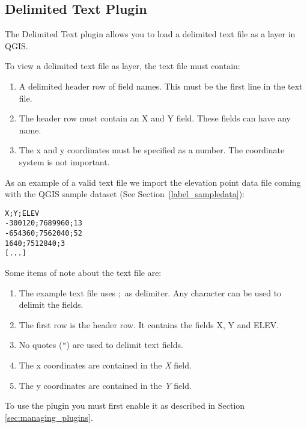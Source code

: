 
\subsection{Delimited Text Plugin}\label{label_dltext}    


The Delimited Text plugin allows you to load a delimited text file as a layer in QGIS. 


To view a delimited text file as layer, the text file must contain:

\begin{enumerate}      
\item A delimited header row of field names. This must be the first line in the text file.
\item The header row must contain an X and Y field. These fields can have any name.
\item The x and y coordinates must be specified as a number. The coordinate system is not important.
\end{enumerate}

As an example of a valid text file we import the elevation point data file 
 coming with the QGIS sample dataset (See Section~\ref{label_sampledata}):

\begin{verbatim} 
X;Y;ELEV
-300120;7689960;13
-654360;7562040;52
1640;7512840;3
[...]
\end{verbatim}

Some items of note about the text file are:

\begin{enumerate}
\item The example text file uses \mbox{$;$} as delimiter. Any character can be used to delimit the fields.
\item The first row is the header row. It contains the fields X, Y and ELEV.
\item No quotes ({\tt{}"{}}) are used to delimit text fields.
\item The x coordinates are contained in the {\em X} field.
\item The y coordinates are contained in the {\em Y} field.
\end{enumerate}

To use the plugin you must first enable it as described in Section \ref{sec:managing_plugins}.

